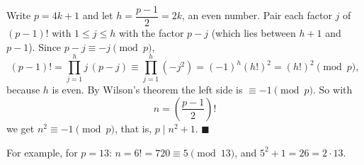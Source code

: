 Write $p=4k+1$ and let $h=\dfrac{p-1}{2}=2k$, an even number. Pair each factor $j$ of $(p-1)!$ with $1\le j\le h$ with the factor $p-j$ (which lies between $h+1$ and $p-1$). Since $p-j\equiv-j\pmod p$,
\[(p-1)!=\prod_{j=1}^{h}j\,(p-j)\equiv\prod_{j=1}^{h}\left(-j^2\right)=(-1)^h\left(h!\right)^2=\left(h!\right)^2\pmod p,\]
because $h$ is even. By Wilson's theorem the left side is $\equiv-1\pmod p$. So with
\[\boxed{n=\left(\dfrac{p-1}{2}\right)!}\]
we get $n^2\equiv-1\pmod p$, that is, $p\mid n^2+1$. $\blacksquare$

For example, for $p=13$: $n=6!=720\equiv5\pmod{13}$, and $5^2+1=26=2\cdot13$.
